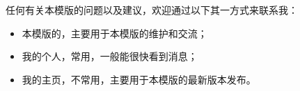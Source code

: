 \begin{conclusion}
    任何有关本模版的问题以及建议，欢迎通过以下其一方式来联系我：
    \begin{itemize}
        \item 本模版的\href{https://jq.qq.com/?_wv=1027&k=eA9mGWmS}{}，主要用于本模版的维护和交流；
        \item 我的个人\href{https://space.bilibili.com/326100515}{}，常用，一般能很快看到消息；
        \item 我的\href{https://space.bilibili.com/326100515}{}主页，不常用，主要用于本模版的最新版本发布。
    \end{itemize}
\end{conclusion}